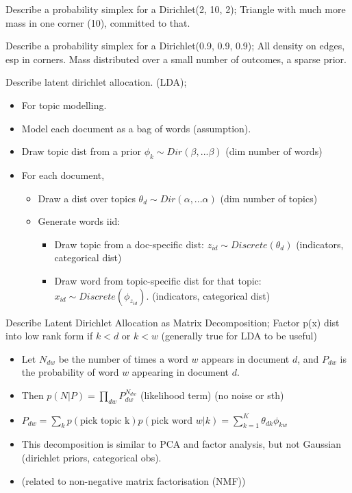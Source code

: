 \documentclass{article}
\begin{document}
Describe a probability simplex for a Dirichlet(2, 10, 2); Triangle with much more mass in one corner (10), committed to that.

Describe a probability simplex for a Dirichlet(0.9, 0.9, 0.9); All density on edges, esp in corners. Mass distributed over a small number of outcomes, a sparse prior.

Describe latent dirichlet allocation. (LDA); \begin{itemize}
    \item For topic modelling. 
    \item Model each document as a bag of words (assumption).
    \item Draw topic dist from a prior $\phi_k\sim Dir(\beta, ...\beta)$ (dim number of words)
    \item For each document, \begin{itemize}
        \item Draw a dist over topics $\theta_d \sim Dir(\alpha, ...\alpha)$ (dim number of topics)
        \item Generate words iid: \begin{itemize}
            \item Draw topic from a doc-specific dist: $z_{id}\sim Discrete (\theta_d)$ (indicators, categorical dist)
            \item Draw word from topic-specific dist for that topic: $x_{id}\sim Discrete(\phi_{z_{id}})$. (indicators, categorical dist)
        \end{itemize}
    \end{itemize}
\end{itemize}

Describe Latent Dirichlet Allocation as Matrix Decomposition; Factor p(x) dist into low rank form  if $k<d$ or $k<w$  (generally true for LDA to be useful) \begin{itemize}
    \item Let $N_{dw}$ be the number of times a word $w$ appears in document $d$, and $P_{dw}$ is the probability of word $w$ appearing in document $d$.
    \item Then $p(N|P)=\prod_{dw}P^{N_{dw}}_{dw}$ (likelihood term) (no noise or sth)
    \item $P_{dw}=\sum_k p(\text{pick topic k})p(\text{pick word }w|k)=\sum_{k=1}^K\theta_{dk}\phi_{kw}$
    \item This decomposition is similar to PCA and factor analysis, but not Gaussian (dirichlet priors, categorical obs).
    \item (related to non-negative matrix factorisation (NMF))
\end{itemize}
\end{document}
